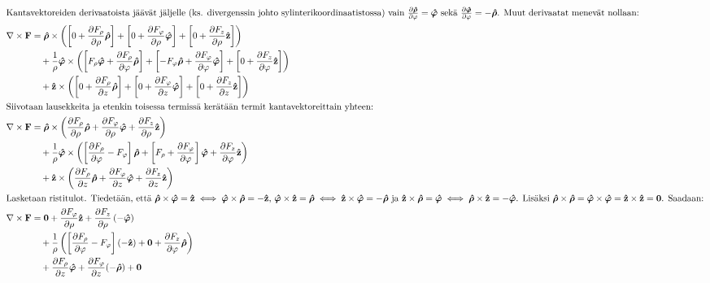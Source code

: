 \documentclass[../johdoksia.tex]{subfiles}
\begin{document}
\begin{enumerate}
\begin{align}
			\intertext{Kantavektoreiden derivaatoista jäävät jäljelle (ks. divergenssin johto sylinterikoordinaatistossa) vain $\pdv{\unitg{\rho}}{\varphi} = \unitg{\varphi}$ sekä $\pdv{\unitg{\varphi}}{\varphi} = -\unitg{\rho}$. Muut derivaatat menevät nollaan:}
			\curlop\vtr{F} &= \unitg{\rho}\times\left(\left[0 + \pdv{F_\rho}{\rho}\unitg{\rho}\right] + \left[0 + \pdv{F_\varphi}{\rho}\unitg{\varphi}\right] + \left[0 + \pdv{F_z}{\rho}\unitv{z}\right]\right) \\
			&\quad + \frac{1}{\rho}\unitg{\varphi}\times\left(\left[F_\rho\unitg{\varphi} + \pdv{F_\rho}{\varphi}\unitg{\rho}\right] + \left[-F_\varphi\unitg{\rho} + \pdv{F_\varphi}{\varphi}\unitg{\varphi}\right] + \left[0 + \pdv{F_z}{\varphi}\unitv{z}\right]\right) \\
			&\quad + \unitv{z}\times\left(\left[0 + \pdv{F_\rho}{z}\unitg{\rho}\right] + \left[0 + \pdv{F_\varphi}{z}\unitg{\varphi}\right] + \left[0 + \pdv{F_z}{z}\unitv{z}\right]\right) \\
			\intertext{Siivotaan lausekkeita ja etenkin toisessa termissä kerätään termit kantavektoreittain yhteen:}
			\curlop\vtr{F} &= \unitg{\rho}\times\left(\pdv{F_\rho}{\rho}\unitg{\rho} + \pdv{F_\varphi}{\rho}\unitg{\varphi} + \pdv{F_z}{\rho}\unitv{z}\right) \\
			&\quad + \frac{1}{\rho}\unitg{\varphi}\times\left(\left[\pdv{F_\rho}{\varphi} - F_\varphi\right]\unitg{\rho} + \left[F_\rho + \pdv{F_\varphi}{\varphi}\right]\unitg{\varphi} + \pdv{F_z}{\varphi}\unitv{z}\right) \\
			&\quad + \unitv{z}\times\left(\pdv{F_\rho}{z}\unitg{\rho} + \pdv{F_\varphi}{z}\unitg{\varphi} + \pdv{F_z}{z}\unitv{z}\right) \\
			\intertext{Lasketaan ristitulot. Tiedetään, että $\unitg{\rho}\times\unitg{\varphi} = \unitv{z} \iff \unitg{\varphi}\times\unitg{\rho} = -\unitv{z}$, $\unitg{\varphi}\times\unitv{z} = \unitg{\rho} \iff \unitv{z}\times\unitg{\varphi} = -\unitg{\rho}$ ja $\unitv{z}\times\unitg{\rho} = \unitg{\varphi} \iff \unitg{\rho}\times\unitv{z} = -\unitg{\varphi}$. Lisäksi $\unitg{\rho}\times\unitg{\rho} = \unitg{\varphi}\times\unitg{\varphi} = \unitv{z}\times\unitv{z} = \vtr{0}$. Saadaan:}
			\curlop\vtr{F} &= \vtr{0} + \pdv{F_\varphi}{\rho}\unitv{z} + \pdv{F_z}{\rho}\left(-\unitg{\varphi}\right) \\
			&\quad + \frac{1}{\rho}\left(\left[\pdv{F_\rho}{\varphi} - F_\varphi\right](-\unitv{z}) + \vtr{0} + \pdv{F_z}{\varphi}\unitg{\rho}\right) \\
			&\quad + \pdv{F_\rho}{z}\unitg{\varphi} + \pdv{F_\varphi}{z}(-\unitg{\rho}) + \vtr{0} \\

\end{align}
\end{enumerate}
\end{document}

